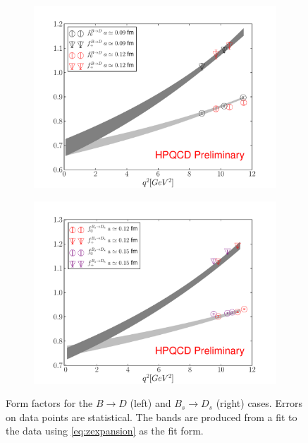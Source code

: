 \documentclass[a4paper,10pt]{article}
\numberwithin{equation}{section}
\begin{document}
\begin{figure}
\centering
\begin{subfigure}{.5\textwidth}
  \centering
  \includegraphics[width=1.0\linewidth]{niceplots/BD_proceedings17.pdf}
  \label{fig:BD_ff}
\end{subfigure}%
\begin{subfigure}{.5\textwidth}
  \centering
  \includegraphics[width=1.0\linewidth]{niceplots/BsDs_proceedings17.pdf}
  \label{fig:BsDs_ff}
\end{subfigure}
\caption{Form factors for the $B\to D$ (left) and $B_s \to D_s$ (right) cases. Errors on data points are statistical. The bands are produced from a fit to the data using \eqref{eq:zexpansion} as the fit form. \label{fig:ff}}
\end{figure}
\end{document}
